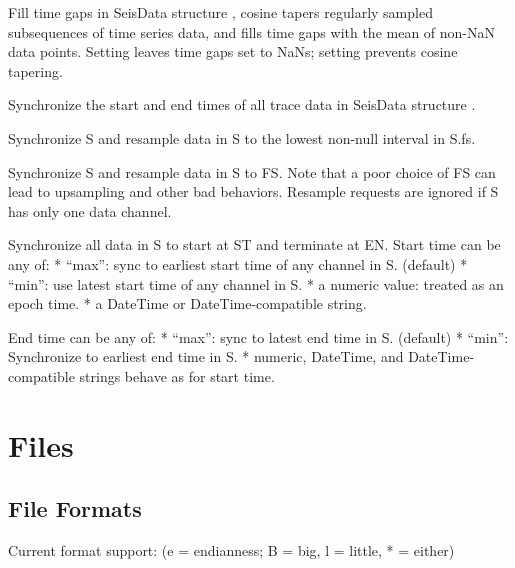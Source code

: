 \documentclass[letterpaper,11pt,english]{sphinxmanual}
\begin{document}
Fill time gaps in SeisData structure , cosine tapers regularly sampled subsequences of time series data, and fills time gaps with the mean of non-NaN data points. Setting  leaves time gaps set to NaNs; setting  prevents cosine tapering.


\begin{fulllineitems}
\end{fulllineitems}


Synchronize the start and end times of all trace data in SeisData structure .


Synchronize S and resample data in S to the lowest non-null interval in S.fs.


Synchronize S and resample data in S to FS. Note that a poor choice of FS can lead to
upsampling and other bad behaviors. Resample requests are ignored if S has only one data
channel.


Synchronize all data in S to start at ST and terminate at EN. Start time can be any of:
* “max”: sync to earliest start time of any channel in S. (default)
* “min”: use latest start time of any channel in S.
* a numeric value: treated as an epoch time.
* a DateTime or DateTime-compatible string.

End time can be any of:
* “max”: sync to latest end time in S. (default)
* “min”: Synchronize to earliest end time in S.
* numeric, DateTime, and DateTime-compatible strings behave as for start time.


\chapter{Files}
\label{\detokenize{index:files}}

\section{File Formats}
\label{\detokenize{src/Formats/fileformats:file-formats}}\label{\detokenize{src/Formats/fileformats::doc}}
Current format support: (e = endianness; B = big, l = little, * = either)
\end{document}
